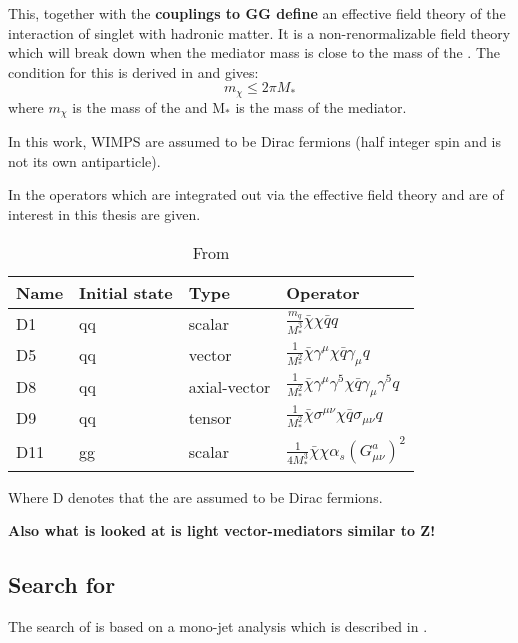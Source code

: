 This, together with the \textbf{couplings to GG define} an effective field theory of the interaction of singlet \abbrWIMPS with hadronic matter. It is a non-renormalizable field theory which will break down when the mediator mass is close to the mass of the \abbrWIMP .
The condition for this is derived in \citep{82.116010} and gives:
\begin{equation}
m_\chi \leqslant 2\pi M_*
\end{equation}
where $m_\chi$ is the mass of the \abbrWIMP and M$_*$ is the mass of the mediator. 

In this work, WIMPS are assumed to be Dirac fermions (half integer spin and is not its own antiparticle). 
 
In  the operators which are integrated out via the effective field theory and are of interest in this thesis are given.
\renewcommand{\arraystretch}{1.5} %
\begin{table}[H]
\begin{center}
    \begin{tabular}{ | l | l | l | l |}
    \hline
    Name & Initial state & Type & Operator \\ \hline
  	D1 & qq & scalar & $\frac{m_q}{M^3_*} \bar{\chi} \chi \bar{q} q$ \\ \hline
  	D5 & qq & vector & $\frac{1}{M^2_*} \bar{\chi} \gamma^\mu \chi \bar{q} \gamma_\mu q$ \\ \hline
  	D8 & qq & axial-vector & $\frac{1}{M^2_*}\bar{\chi}\gamma^\mu \gamma^5 \chi \bar{q} \gamma_\mu \gamma^5 q $ \\ \hline
  	D9 & qq & tensor & $\frac{1}{M^2_*} \bar{\chi}\sigma^{\mu \nu} \chi \bar{q} \sigma_{\mu \nu} q  $\\ \hline
  	D11 & gg & scalar & $\frac{1}{4M^3_*}\bar{\chi}\chi \alpha_s (G^a_{\mu \nu})^2 $\\ \hline
  	\end{tabular}

  	\caption{From \citep{CERN-PH-EP-2012-210}}
  	\label{tab:operators}
  	  	\end{center}
    \end{table}
\renewcommand{\arraystretch}{1.0}  %
Where D denotes that the \abbrWIMPS are assumed to be Dirac fermions.

\textbf{Also what is looked at is light vector-mediators similar to Z!}

\subsection{Search for \abbrWIMPS}
The search of \abbrWIMPS is based on a mono-jet analysis which is described in . 


